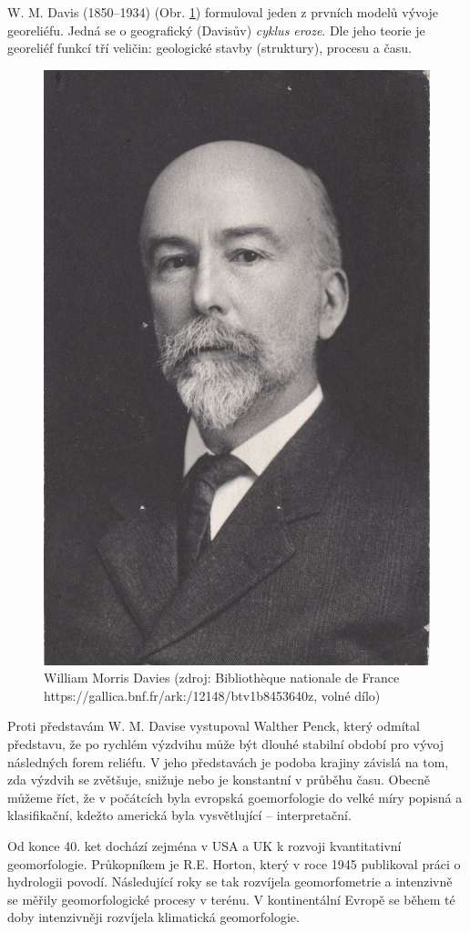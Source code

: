 W. M. Davis (1850--1934) (Obr. \ref{fig:davies}) formuloval jeden z prvních modelů vývoje georeliéfu. Jedná se o geografický (Davisův) \emph{cyklus eroze}. Dle jeho teorie je georeliéf funkcí tří veličin: geologické stavby (struktury), procesu a času. 
\begin{figure}[h]
	\centering
	\includegraphics[width=0.7\linewidth]{obrazky/uvod/davies}
	\caption{William Morris Davies (zdroj: Bibliothèque nationale de France https://gallica.bnf.fr/ark:/12148/btv1b8453640z, volné dílo)}
	\label{fig:davies}
\end{figure}

Proti představám W. M. Davise vystupoval Walther Penck, který odmítal představu, že po rychlém výzdvihu může být dlouhé stabilní období pro vývoj následných forem reliéfu. V jeho představách je podoba krajiny závislá na tom, zda výzdvih se zvětšuje, snižuje nebo je konstantní v průběhu času.
Obecně můžeme říct, že v počátcích byla evropská goemorfologie do velké míry popisná a klasifikační, kdežto americká byla vysvětlující -- interpretační.

Od konce 40. ket dochází zejména v USA a UK k rozvoji kvantitativní geomorfologie. Průkopníkem je R.E. Horton, který v roce 1945 publikoval práci o hydrologii povodí. Následující roky se tak rozvíjela geomorfometrie a intenzivně se měřily geomorfologické procesy v terénu. V kontinentální Evropě se během té doby intenzivněji rozvíjela klimatická geomorfologie.

